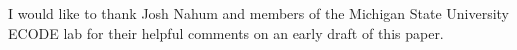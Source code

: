 \documentclass[sigconf]{acmart}
\begin{document}
\begin{acks}
I would like to thank Josh Nahum and members of the Michigan State University ECODE lab for their helpful comments on an early draft of this paper.
\end{acks}












\end{document}
